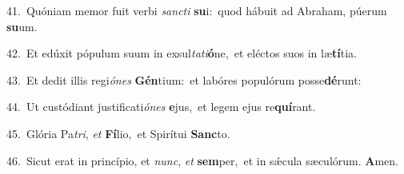 {\numbfont\textcolor{\numbcolor}{41.}}~Quóniam memor fuit verbi \textit{sanc}\-\textit{ti} \textbf{su}\-i:~\star quod hábuit ad Abraham, púerum \textbf{su}\-um.\par
{\numbfont\textcolor{\numbcolor}{42.}}~Et edúxit pópulum suum in exsul\-\textit{ta}\-\textit{ti}\textbf{ó}ne,~\star et eléctos suos in læ\-\textbf{tí}\-tia.\par
{\numbfont\textcolor{\numbcolor}{43.}}~Et dedit illis regi\-\textit{ó}\-\textit{nes} \textbf{Gén}\-tium:~\star et labóres populórum posse\-\textbf{dé}\-runt:\par
{\numbfont\textcolor{\numbcolor}{44.}}~Ut custódiant justificati\-\textit{ó}\-\textit{nes} \textbf{e}\-jus,~\star et legem ejus re\-\textbf{quí}\-rant.\par
{\numbfont\textcolor{\numbcolor}{45.}}~Glória Pa\-\textit{tri}\-, \textit{et} \textbf{Fí}\-lio,~\star et Spirítui \textbf{Sanc}\-to.\par
{\numbfont\textcolor{\numbcolor}{46.}}~Sicut erat in princípio, et \textit{nunc}\-, \textit{et} \textbf{sem}\-per,~\star et in sǽcula sæculórum. \textbf{A}\-men.\par
